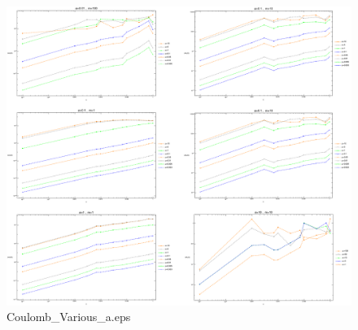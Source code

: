 \documentclass[hyperref]{ctexart}
\begin{document}
\begin{figure}
  \centering
  \includegraphics[width=6in]{Test_Determine_a_CoulombPotential.pdf}
  \caption{Coulomb\_Various\_a.eps}
\end{figure}
\end{document}
